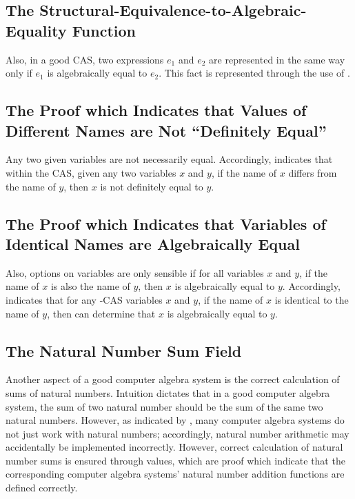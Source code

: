 \documentclass{report}
\begin{document}
\subsection{The Structural-Equivalence-to-Algebraic-Equality Function}
Also, in a good CAS, two expressions \(e_1\) and \(e_2\) are represented in the same way only if \(e_1\) is algebraically equal to \(e_2\).  This fact is represented through the use of .

\subsection{The Proof which Indicates that Values of Different Names are Not ``Definitely Equal''}
Any two given variables are not necessarily equal.  Accordingly,   indicates that within the  CAS, given any two  variables \(x\) and \(y\), if the name of \(x\) differs from the name of \(y\), then \(x\) is not definitely equal to \(y\).

\subsection{The Proof which Indicates that Variables of Identical Names are Algebraically Equal}
Also, options on variables are only sensible if for all variables \(x\) and \(y\), if the name of \(x\) is also the name of \(y\), then \(x\) is algebraically equal to \(y\).  Accordingly,   indicates that for any -CAS variables \(x\) and \(y\), if the name of \(x\) is identical to the name of \(y\), then  can determine that \(x\) is algebraically equal to \(y\).

\subsection{The Natural Number Sum Field}
Another aspect of a good computer algebra system is the correct calculation of sums of natural numbers.  Intuition dictates that in a good computer algebra system, the sum of two natural number should be the sum of the same two natural numbers.  However, as indicated by , many computer algebra systems do not just work with natural numbers; accordingly, natural number arithmetic may accidentally be implemented incorrectly.  However, correct calculation of natural number sums is ensured through  values, which are proof which indicate that the corresponding computer algebra systems' natural number addition functions are defined correctly.
\end{document}
